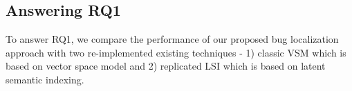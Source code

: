 \documentclass[conference]{IEEEtran}
\begin{document}
\subsection{Answering RQ1} \label{RQ1answer}
To answer RQ1, we compare the performance of our proposed bug localization approach with two re-implemented existing techniques - 1) classic VSM which is based on vector space model and 2) replicated LSI \cite{MarcusLSI} which is based on latent semantic indexing.
\begin{table}[htbp]
	\centering
	\caption{Performance comparison of replicated basic VSM and proposed technique (BLuAMIR)}
	\label{tab:Performance2}
\end{table}
\end{document}
